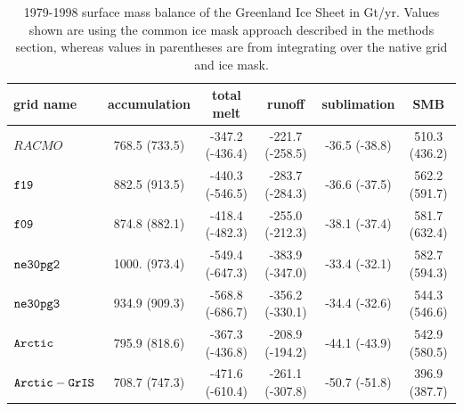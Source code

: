 \documentclass[draft]{agujournal2019}
\begin{document}
 \begin{table}
 \centering
 \scriptsize
 \begin{tabular}{lccccc}
   \hline
   grid name & accumulation & total melt & runoff & sublimation & SMB \\ 
   \hline
   $RACMO$ & 768.5 (733.5) & -347.2 (-436.4) & -221.7 (-258.5) & -36.5 (-38.8) & 510.3 (436.2) \\
   \hline
   $\tt f19$ & 882.5 (913.5) & -440.3 (-546.5) & -283.7 (-284.3) & -36.6 (-37.5) & 562.2 (591.7) \\
   $\tt f09$ & 874.8 (882.1) & -418.4 (-482.3) & -255.0 (-212.3) & -38.1 (-37.4) & 581.7 (632.4) \\
   $\tt ne30pg2$ & 1000. (973.4) & -549.4 (-647.3) & -383.9 (-347.0) & -33.4 (-32.1) & 582.7 (594.3) \\
   $\tt ne30pg3$ & 934.9 (909.3) & -568.8 (-686.7) & -356.2 (-330.1) & -34.4 (-32.6) & 544.3 (546.6) \\
   $\tt Arctic$ & 795.9 (818.6) & -367.3 (-436.8) & -208.9 (-194.2) & -44.1 (-43.9) & 542.9 (580.5) \\
   $\tt Arctic-GrIS$ & 708.7 (747.3) & -471.6 (-610.4) & -261.1 (-307.8) & -50.7 (-51.8) & 396.9 (387.7) \\
 \hline
 \end{tabular}
  \caption{1979-1998 surface mass balance of the Greenland Ice Sheet in Gt/yr. Values shown are using the common ice mask approach described in the methods section, whereas values in parentheses are from integrating over the native grid and ice mask. {\color{red}{ARH - these numbers need updating ... they are only for method 1.}}}
 \label{tbl:table3}
 \end{table}
\end{document}
